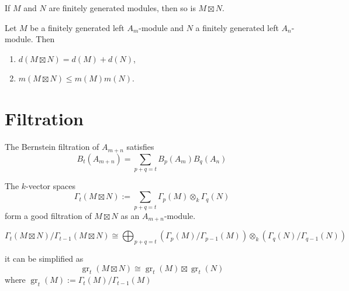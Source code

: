 \documentclass[12pt, oneside]{book}
\begin{document}
\begin{proposition}
    If $M$ and $N$ are finitely generated modules, then so is $M \boxtimes N$.
\end{proposition}


\begin{theorem}
    Let $M$ be a finitely generated left $A_m$-module and $N$ a finitely generated left $A_n$-module. Then
    \begin{enumerate}
        \item
              $d(M \boxtimes N)=d(M)+d(N)$,
        \item
              $m(M \boxtimes N) \leq m(M) m(N)$.
    \end{enumerate}
\end{theorem}


\section{Filtration}
\begin{lemma}
    The Bernstein filtration of $ A_{m+n}$ satisfies   \begin{equation*}
        B_t\left(A_{m+n}\right)=\sum_{p+q=t} B_p\left(A_m\right) B_q\left(A_n\right)
    \end{equation*}
\end{lemma}

\begin{lemma}
    The $k$-vector spaces
    \begin{equation*}
        \Gamma_t(M \boxtimes N)
        :=
        \sum_{p+q=t} \Gamma_p(M) \otimes_k \Gamma_q(N)
    \end{equation*}
    form a good filtration of $M \boxtimes N$ as an $A_{m+n}$-module.
\end{lemma}
\begin{lemma}
    \begin{equation*}
        \Gamma_t(M \boxtimes N)/\Gamma_{t-1}(M \boxtimes N)
        \cong
        \bigoplus_{p+q=t} \left(\Gamma_p(M)/\Gamma_{p-1}(M)\right) \otimes_k \left(\Gamma_q(N)/\Gamma_{q-1}(N)\right)
    \end{equation*}
    \begin{remark}
        it can be simplified as
        \begin{equation*}
            \operatorname{gr}_t(M \boxtimes N)
            \cong
            \operatorname{gr}_t(M) \boxtimes \operatorname{gr}_t(N)
        \end{equation*}
        where $\operatorname{gr}_t(M):=\Gamma_t(M)/\Gamma_{t-1}(M)$
    \end{remark}
\end{lemma}
\end{document}
